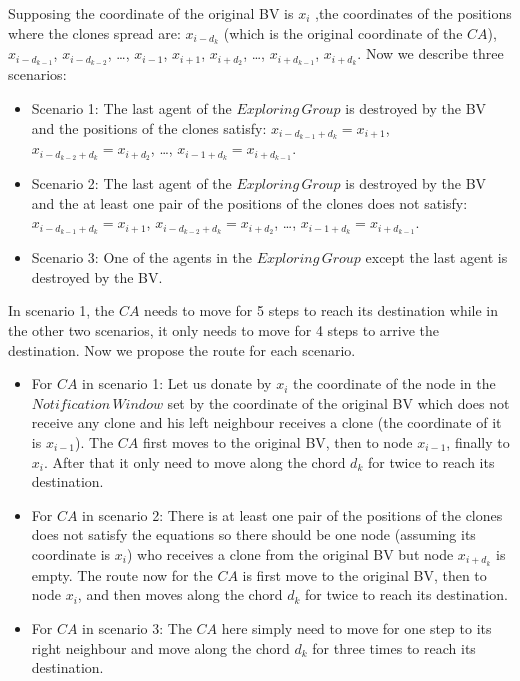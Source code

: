 Supposing the coordinate of the original BV is $x_i$ ,the coordinates of the positions where the clones spread are: $x_{i-d_k}$ (which is the original coordinate of the $CA$), $x_{i-d_{k-1}}$, $x_{i-d_{k-2}}$, \ldots, $x_{i-1}$, $x_{i+1}$, $x_{i+d_2}$, \ldots, $x_{i+d_{k-1}}$, $x_{i+d_{k}}$.
Now we describe three scenarios:
\begin{itemize}
\item Scenario 1: The last agent of the $Exploring\,Group$ is destroyed by the BV and the positions of the clones satisfy: $x_{i-d_{k-1}+d_{k}}=x_{i+1}$, $x_{i-d_{k-2}+d_{k}}=x_{i+d_2}$, \ldots, $x_{{i-1}+d_{k}}=x_{i+d_{k-1}}$. 
\item Scenario 2: The last agent of the $Exploring\,Group$ is destroyed by the BV and the at least one pair of the positions of the clones does not satisfy: $x_{i-d_{k-1}+d_{k}}=x_{i+1}$, $x_{i-d_{k-2}+d_{k}}=x_{i+d_2}$, \ldots, $x_{{i-1}+d_{k}}=x_{i+d_{k-1}}$. 
\item Scenario 3: One of the agents in the $Exploring\,Group$ except the last agent is destroyed by the BV.
\end{itemize}

In scenario 1, the $CA$ needs to move for 5 steps to reach its destination while in the other two scenarios, it only needs to move for 4 steps to arrive the destination. Now we propose the route for each scenario.
\begin{itemize}
\item For $CA$ in scenario 1: Let us donate by $x_i$ the coordinate of the node in the $Notification\,Window$ set by the coordinate of the original BV which does not receive any clone and his left neighbour receives a clone (the coordinate of it is $x_{i-1}$). The $CA$ first moves to the original BV, then to node $x_{i-1}$, finally to $x_i$. After that it only need to move along the chord $d_k$ for twice to reach its destination.
\item For $CA$ in scenario 2: There is at least one pair of the positions of the clones does not satisfy the equations so there should be one node (assuming its coordinate is $x_i$) who receives a clone from the original BV but node $x_{i+d_k}$ is empty. The route now for the $CA$ is first move to the original BV, then to node $x_i$, and then moves along the chord $d_k$ for twice to reach its destination.
\item For $CA$ in scenario 3: The $CA$ here simply need to move for one step to its right neighbour and move along the chord $d_k$ for three times to reach its destination.
\end{itemize}

